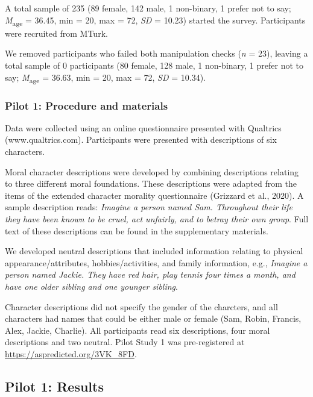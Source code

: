 \documentclass[
  english,
  man,floatsintext]{apa7}
\begin{document}
A total sample of 235 (89 female, 142 male, 1 non-binary, 1 prefer not to say; \emph{M}\textsubscript{age} = 36.45, min = 20, max = 72, \emph{SD} = 10.23) started the survey. Participants were recruited from MTurk.

We removed participants who failed both manipulation checks (\emph{n} = 23), leaving a total sample of 0 participants (80 female, 128 male, 1 non-binary, 1 prefer not to say; \emph{M}\textsubscript{age} = 36.63, min = 20, max = 72, \emph{SD} = 10.34).

\hypertarget{pilot-1-procedure-and-materials}{%
\subsubsection{Pilot 1: Procedure and materials}\label{pilot-1-procedure-and-materials}}

Data were collected using an online questionnaire presented with Qualtrics (www.qualtrics.com). Participants were presented with descriptions of six characters.

Moral character descriptions were developed by combining descriptions relating to three different moral foundations. These descriptions were adapted from the items of the extended character morality questionnaire (Grizzard et al., 2020). A sample description reads: \emph{Imagine a person named Sam. Throughout their life they have been known to be cruel, act unfairly, and to betray their own group}. Full text of these descriptions can be found in the supplementary materials.

We developed neutral descriptions that included information relating to physical appearance/attributes, hobbies/activities, and family information, e.g., \emph{Imagine a person named Jackie. They have red hair, play tennis four times a month, and have one older sibling and one younger sibling}.

Character descriptions did not specify the gender of the charcters, and all characters had names that could be either male or female (Sam, Robin, Francis, Alex, Jackie, Charlie). All participants read six descriptions, four moral descriptions and two neutral. Pilot Study 1 was pre-registered at \color{blue}\url{https://aspredicted.org/3VK_8FD}\color{black}.

\hypertarget{pilot-1-results}{%
\subsection{Pilot 1: Results}\label{pilot-1-results}}
\end{document}
